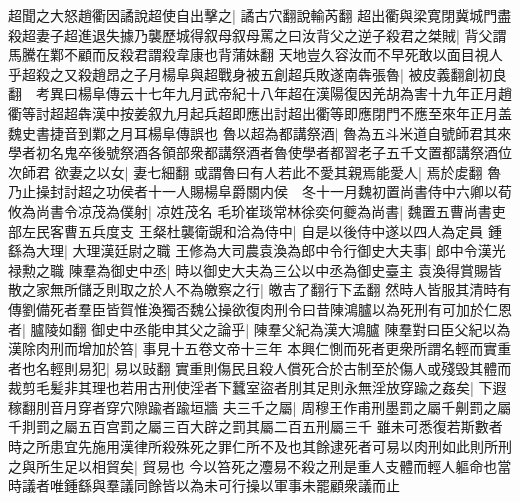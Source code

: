 超聞之大怒趙衢因譎說超使自出擊之|{
	譎古穴翻說輸芮翻}
超出衢與梁寛閉冀城門盡殺超妻子超進退失據乃襲歷城得叙母叙母罵之曰汝背父之逆子殺君之桀賊|{
	背父謂馬騰在鄴不顧而反殺君謂殺韋康也背蒲妹翻}
天地豈久容汝而不早死敢以面目視人乎超殺之又殺趙昂之子月楊阜與超戰身被五創超兵敗遂南犇張魯|{
	被皮義翻創初良翻　考異曰楊阜傳云十七年九月武帝紀十八年超在漢陽復因羌胡為害十九年正月趙衢等討超超犇漢中按姜叙九月起兵超即應出討超出衢等即應閉門不應至來年正月盖魏史書捷音到鄴之月耳楊阜傳誤也}
魯以超為都講祭酒|{
	魯為五斗米道自號師君其來學者初名鬼卒後號祭酒各領部衆都講祭酒者魯使學者都習老子五千文置都講祭酒位次師君}
欲妻之以女|{
	妻七細翻}
或謂魯曰有人若此不愛其親焉能愛人|{
	焉於䖍翻}
魯乃止操封討超之功侯者十一人賜楊阜爵關内侯　冬十一月魏初置尚書侍中六卿以荀攸為尚書令凉茂為僕射|{
	凉姓茂名}
毛玠崔琰常林徐奕何夔為尚書|{
	魏置五曹尚書吏部左民客曹五兵度支}
王粲杜襲衛覬和洽為侍中|{
	自是以後侍中遂以四人為定員}
鍾繇為大理|{
	大理漢廷尉之職}
王修為大司農袁渙為郎中令行御史大夫事|{
	郎中令漢光禄勲之職}
陳羣為御史中丞|{
	時以御史大夫為三公以中丞為御史臺主}
袁渙得賞賜皆散之家無所儲乏則取之於人不為皦察之行|{
	皦吉了翻行下孟翻}
然時人皆服其清時有傳劉備死者羣臣皆賀惟渙獨否魏公操欲復肉刑令曰昔陳鴻臚以為死刑有可加於仁恩者|{
	臚陵如翻}
御史中丞能申其父之論乎|{
	陳羣父紀為漢大鴻臚}
陳羣對曰臣父紀以為漢除肉刑而增加於笞|{
	事見十五卷文帝十三年}
本興仁惻而死者更衆所謂名輕而實重者也名輕則易犯|{
	易以䜴翻}
實重則傷民且殺人償死合於古制至於傷人或殘毁其體而裁剪毛髪非其理也若用古刑使淫者下蠶室盜者刖其足則永無淫放穿踰之姦矣|{
	下遐稼翻刖音月穿者穿穴隙踰者踰垣牆}
夫三千之屬|{
	周穆王作甫刑墨罰之屬千劓罰之屬千剕罰之屬五百宫罰之屬三百大辟之罰其屬二百五刑屬三千}
雖未可悉復若斯數者時之所患宜先施用漢律所殺殊死之罪仁所不及也其餘逮死者可易以肉刑如此則所刑之與所生足以相貿矣|{
	貿易也}
今以笞死之灋易不殺之刑是重人支體而輕人軀命也當時議者唯鍾繇與羣議同餘皆以為未可行操以軍事未罷顧衆議而止

